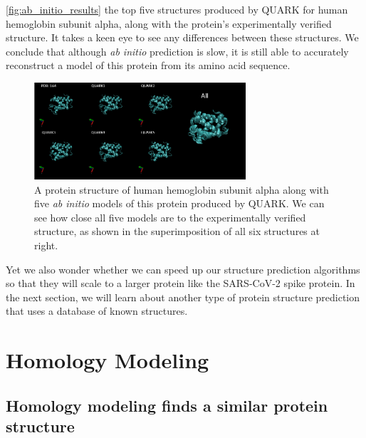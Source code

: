{{\autoref{fig:ab_initio_results} the top five structures produced by QUARK for human hemoglobin subunit alpha, along with the protein's experimentally verified structure. It takes a keen eye to see any differences between these structures. We conclude that although \textit{ab initio} prediction is slow, it is still able to accurately reconstruct a model of this protein from its amino acid sequence.

\begin{figure}[h]
	\centering
	\mySfFamily
	\includegraphics[width = 0.7\textwidth]{../images/ab_initio_results.png}
	\caption{A protein structure of human hemoglobin subunit alpha along with five \textit{ab initio} models of this protein produced by QUARK. We can see how close all five models are to the experimentally verified structure, as shown in the superimposition of all six structures at right.}
	\label{fig:ab_initio_results}
\end{figure}

Yet we also wonder whether we can speed up our structure prediction algorithms so that they will scale to a larger protein like the SARS-CoV-2 spike protein. In the next section, we will learn about another type of protein structure prediction that uses a database of known structures.

\begin{qbox}\end{qbox}

\FloatBarrier
{}

\section{Homology Modeling}
\label{sec:homology}
\subsection{Homology modeling finds a similar protein structure}

}}
